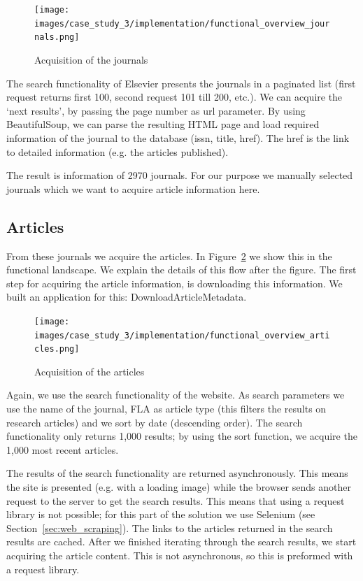 \documentclass{ou-report}
\begin{document}
\begin{figure}[H]
\centering
\texttt{[image: images/case\_study\_3/implementation/functional\_overview\_journals.png]}
\caption{Acquisition of the journals}
\label{fig:functional_overview_elsevier_journals}
\end{figure}

The search functionality of Elsevier presents the journals in a paginated 
list (first request returns first 100, second request 101 till 200, etc.). 
We can acquire the `next results', by passing the page number as url 
parameter. By using BeautifulSoup, we can parse the resulting HTML page
and load required information of the journal to the database (issn, title, 
href). The href is the link to detailed information (e.g. the articles 
published).

The result is information of 2970 journals. For our purpose we manually 
selected journals which we want to acquire article information here.

\subsection{Articles}
From these journals we acquire the articles. In
Figure~\ref{fig:functional_overview_elsevier_articles} we show this in the functional
landscape. We explain the details of this flow after the figure.
The first step for acquiring the article information, is downloading this 
information. We built an application for this: DownloadArticleMetadata. 
\begin{figure}[H]
\centering
\texttt{[image: images/case\_study\_3/implementation/functional\_overview\_articles.png]}
\caption{Acquisition of the articles}
\label{fig:functional_overview_elsevier_articles}
\end{figure}

Again, we use the search functionality of the website. As search
parameters we use the name of the journal, FLA as article type (this
filters the results on research articles) and we sort by date (descending order).
The search functionality only returns 1,000 results; by using the sort function,
we acquire the 1,000 most recent articles.

The results of the search functionality are returned asynchronously. This means
the site is presented (e.g. with a loading image) while the browser sends another
request to the server to get the search results. This means that using a request
library is not possible; for this part of the solution we use Selenium
(see Section~\ref{sec:web_scraping}). The links to the articles returned in the search
results are cached. After we finished
iterating through the search results, we start acquiring the article content. This
is not asynchronous, so this is preformed with a request library.
\end{document}

